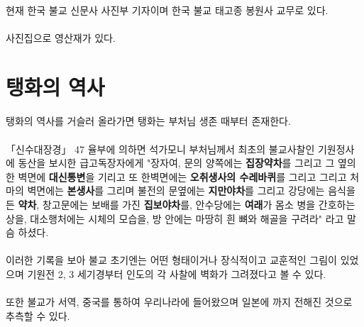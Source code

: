 \documentclass[12pt, a4paper, oneside]{book}
\let\stdsection\section
\renewcommand\section{\newpage\stdsection}
\begin{document}
\paragraph{}
현재 한국 불교 신문사 사진부 기자이며 한국 불교 태고종 봉원사 교무로 있다.

\paragraph{}
사진집으로 영산재가 있다.



	\section{ 탱화의 역사 }


\paragraph{}
탱화의 역사를 거슬러 올라가면 탱화는 부처님 생존 때부터 존재한다.

\paragraph{}
「신수대장경」 47 율부에 의하면 
석가모니 부처님께서 최초의 불교사찰인 기원정사에 동산을 보시한 급고독장자에게
"장자여, 문의 양쪽에는 \textbf{집장약차}를 그리고 
그 옆의 한 벽면에 \textbf{대신통변}을 기리고
또 한벽면에는 \textbf{오취생사의 수레바퀴}를 그리고
그리고 처마의 벽면에는 \textbf{본생사}를 그리며
불전의 문옆에는 \textbf{지만야차}를 그리고
강당에는 음식을 든 \textbf{약차},
창고문에는 보배를 가진 \textbf{집보야차}를,
안수당에는 \textbf{여래}가 몸소 병을 간호하는 상을,
대소행처에는 시체의 모습을,
방 안에는  마땅히 흰 뼈와 해골을 구려라"
라고 말슴 하셨다.

\paragraph{}
이러한 기록을 보아 
불교 초기엔는 어떤 형태이거나 장식적이고
교훈적인 그림이 있었으며
기원전 2, 3 세기경부터 인도의 각 사찰에 벽화가
그려졌다고 볼 수 있다.

\paragraph{}
또한 불교가 서역, 중국를 통하여 우리나라에 들어왔으며 일본에 까지 전해진 것으로 추측할 수 있다.
\end{document}
